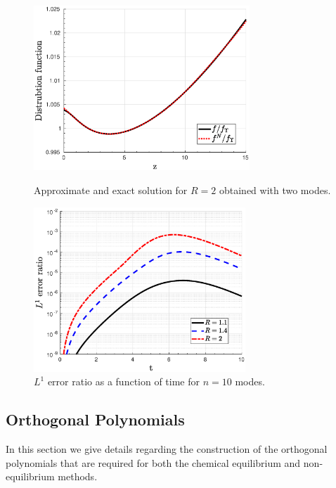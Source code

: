 \begin{figure}[ht]
\begin{minipage}[t]{0.5\linewidth}
\centerline{\includegraphics[height=6.2cm]{06-appendix/SpectralMethodBoltzmann/Figures/keq_approx_T_r_2.eps}}
\caption{Approximate and exact solution for $R=2$ obtained with two modes.}\label{fig:keq_approx_Tr_2}
 \end{minipage}
 \hspace{0.5cm}
 \begin{minipage}[t]{0.5\linewidth}
\centerline{\includegraphics[height=6.2cm]{06-appendix/SpectralMethodBoltzmann/Figures/keq_L1_err_time.eps}}
\caption{$L^1$ error ratio as a function of time for $n=10$ modes.}\label{fig:keq_L1_err_time}
\end{minipage}
\end{figure}






\subsection{Orthogonal Polynomials}\label{orthopoly_app}
In this section we give details regarding the construction of the orthogonal polynomials that are required for both the chemical equilibrium and non-equilibrium methods.
